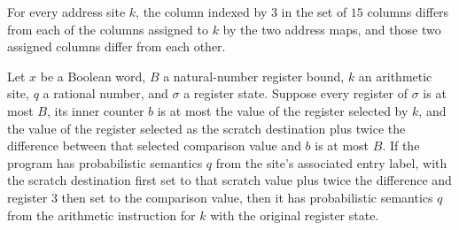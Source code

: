 \begin{lemma}
\label{Complexity.LogProg.adSite_ne}
\leanok
{}
For every address site $k$, the column indexed by $3$ in the set of $15$ columns differs
from each of the columns assigned to $k$ by the two address maps, and those two assigned
columns differ from each other.
\end{lemma}

\begin{lemma}
\label{Complexity.LogProg.ups_ad}
\leanok
{}
Let $x$ be a Boolean word, $B$ a natural-number register bound, $k$ an arithmetic site,
$q$ a rational number, and $\sigma$ a register state. Suppose every register of $\sigma$
is at most $B$, its inner counter $b$ is at most the value of the register selected by
$k$, and the value of the register selected as the scratch destination plus twice the
difference between that selected comparison value and $b$ is at most $B$. If the program
has probabilistic semantics $q$ from the site’s associated entry label, with the scratch
destination first set to that scratch value plus twice the difference and register $3$
then set to the comparison value, then it has probabilistic semantics $q$ from the
arithmetic instruction for $k$ with the original register state.
\end{lemma}

